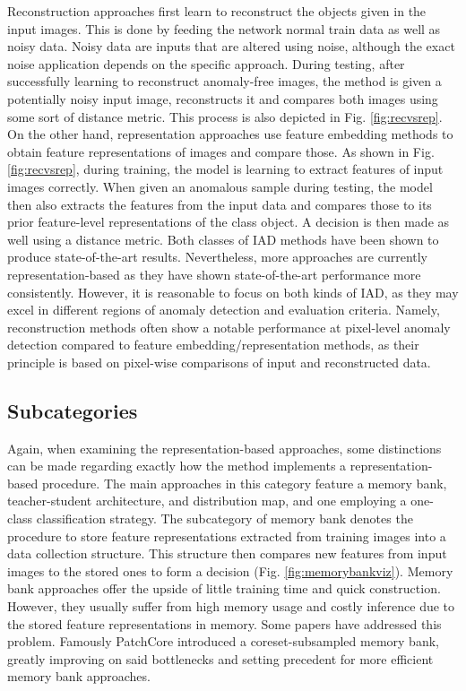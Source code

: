 Reconstruction approaches first learn to reconstruct the objects given in the input images. This is done by feeding the network normal train data as well as noisy data. Noisy data are inputs
that are altered using noise, although the exact noise application depends on the specific approach. During testing, after successfully learning to 
reconstruct anomaly-free images, the method is given a potentially noisy input image, reconstructs it and compares both images using some sort of distance metric. This process is also depicted in Fig. \ref{fig:recvsrep}. 
On the other hand, representation approaches use feature embedding methods to obtain feature representations of images and compare those. As shown in Fig. \ref{fig:recvsrep}, during training, the model is 
learning to extract features of input images correctly. When given an anomalous sample during testing, the model then also extracts the features from the input data and compares those to its 
prior feature-level representations of the class object. A decision is then made as well using a distance metric.\newline
Both classes of IAD methods have been shown to produce state-of-the-art results. Nevertheless, more approaches are currently representation-based \cite{liu2024deep} as they have shown state-of-the-art performance more 
consistently. However, it is reasonable to focus on both kinds of IAD, as they may excel in different regions of anomaly detection and evaluation criteria. Namely, reconstruction methods often show a notable performance at pixel-level anomaly detection compared to feature embedding/representation methods, as their principle is based on pixel-wise comparisons of input 
and reconstructed data.



\subsection{Subcategories}

Again, when examining the representation-based approaches, some distinctions can be made regarding exactly how the method implements a representation-based procedure.
The main approaches in this category feature a memory bank, teacher-student architecture, and distribution map, and one employing a one-class classification strategy. The subcategory of 
memory bank denotes the procedure to store feature representations extracted from training images into a data collection structure. This structure then compares new 
features from input images to the stored ones to form a decision (Fig. \ref{fig:memorybankviz}). Memory bank approaches offer the upside of little training time and quick construction. However, they usually suffer from high memory 
usage and costly inference due to the stored feature representations in memory. Some papers have addressed this problem. Famously PatchCore \cite{patchCore2022} introduced a coreset-subsampled 
memory bank, greatly improving on said bottlenecks and setting precedent for more efficient memory bank approaches. \newline

